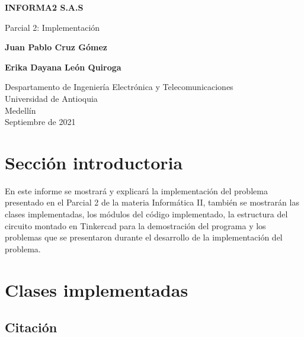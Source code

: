 \documentclass{article}
\begin{document}
\begin{titlepage}
    \begin{center}
        \vspace*{1cm}
            
        \Huge
        \textbf{INFORMA2 S.A.S}
            
        \vspace{0.5cm}
        \LARGE
        Parcial 2: Implementación
            
        \vspace{5cm}
            
        \textbf{Juan Pablo Cruz Gómez}
        
        \vspace{0.5cm}
        
        \textbf{Erika Dayana León Quiroga}
            
        \vfill
            
        \vspace{0.8cm}
            
        \Large
        Despartamento de Ingeniería Electrónica y Telecomunicaciones\\
        Universidad de Antioquia\\
        Medellín\\
        Septiembre de 2021
            
    \end{center}
\end{titlepage}

\tableofcontents
\newpage
\section{Sección introductoria}\label{intro}
En este informe se mostrará y explicará la implementación del problema presentado en el Parcial 2 de la materia Informática II, también se mostrarán las clases implementadas, los módulos del código implementado, la estructura del circuito montado en Tinkercad para la demostración del programa y los problemas que se presentaron durante el desarrollo de la implementación del problema.

\section{Clases implementadas} \label{clases}

\subsection{Citación}
\end{document}
